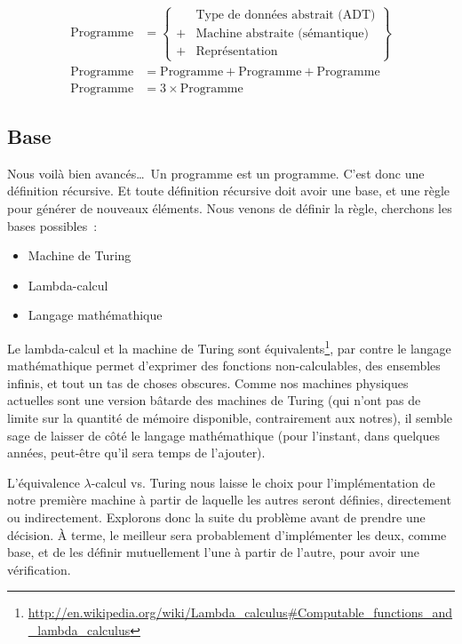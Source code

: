 \documentclass{article}
\begin{document}
\begin{align}
  \text{Programme} &= \left\lbrace
      \begin{array}{rl}
          &\text{Type de données abstrait (ADT)}\\
        + &\text{Machine abstraite (sémantique)}\\
        + &\text{Représentation}
      \end{array}
      \right\rbrace\\
  \text{Programme} &= \text{Programme} + \mathrm{Programme} + \mathrm{Programme}\\
  \text{Programme} &= 3 \times \text{Programme}
\end{align}

\subsection{Base}

Nous voilà bien avancés\dots\ Un programme est un programme. C'est donc une définition récursive. Et toute définition récursive doit avoir une base, et une règle pour générer de nouveaux éléments. Nous venons de définir la règle, cherchons les bases possibles~:
\begin{itemize}
\item Machine de Turing
\item Lambda-calcul
\item Langage mathémathique
\end{itemize}

Le lambda-calcul et la machine de Turing sont équivalents\footnote{\url{http://en.wikipedia.org/wiki/Lambda_calculus\#Computable_functions_and_lambda_calculus}}, par contre le langage mathémathique permet d'exprimer des fonctions non-calculables, des ensembles infinis, et tout un tas de choses obscures. Comme nos machines physiques actuelles sont une version bâtarde des machines de Turing (qui n'ont pas de limite sur la quantité de mémoire disponible, contrairement aux notres), il semble sage de laisser de côté le langage mathémathique (pour l'instant, dans quelques années, peut-être qu'il sera temps de l'ajouter).

L'équivalence $\lambda$-calcul vs. Turing nous laisse le choix pour l'implémentation de notre première machine à partir de laquelle les autres seront définies, directement ou indirectement. Explorons donc la suite du problème avant de prendre une décision. À terme, le meilleur sera probablement d'implémenter les deux, comme base, et de les définir mutuellement l'une à partir de l'autre, pour avoir une vérification.
\end{document}
